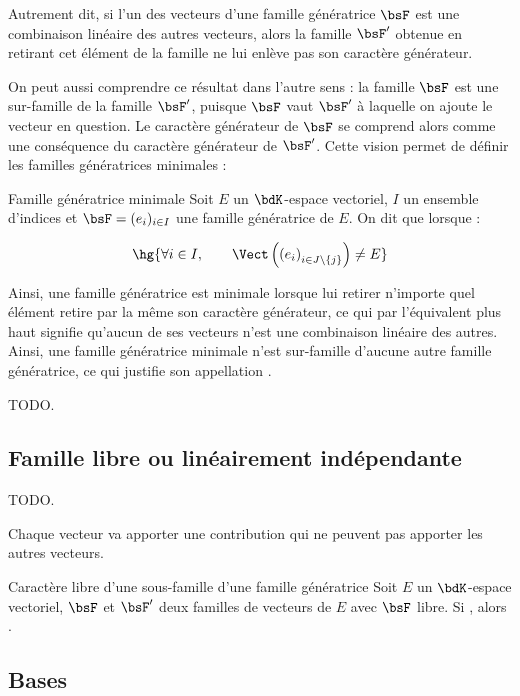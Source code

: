 \documentclass[a4paper,french,bookmarks]{article}
\begin{document}
Autrement dit, si l'un des vecteurs d'une famille génératrice $\bsF$ est une combinaison linéaire des autres vecteurs, alors la famille $\bsF'$ obtenue en retirant cet élément de la famille ne lui enlève pas son caractère générateur.

On peut aussi comprendre ce résultat dans l'autre sens : la famille $\bsF$ est une sur-famille de la famille $\bsF'$, puisque $\bsF$ vaut $\bsF'$ à laquelle on ajoute le vecteur en question. Le caractère générateur de $\bsF$ se comprend alors comme une conséquence du caractère générateur de $\bsF'$. Cette vision permet de définir les familles génératrices minimales :

\begin{definition}{Famille génératrice minimale}{}
    Soit $E$ un $\bdK$-espace vectoriel, $I$ un ensemble d'indices et $\bsF = (e_i)_{i \in I} $ une famille génératrice de $E$. On dit que  lorsque :
    
    \[ \hg{\forall i \in I,\qquad \Vect\left(\left(e_i\right)_{i \in J \backslash \{ j \}}\right) \neq E}\]
\end{definition}

Ainsi, une famille génératrice est minimale lorsque lui retirer n'importe quel élément retire par la même son caractère générateur, ce qui par l'équivalent plus haut signifie qu'aucun de ses vecteurs n'est une combinaison linéaire des autres. Ainsi, une famille génératrice minimale n'est sur-famille d'aucune autre famille génératrice, ce qui justifie son appellation .

TODO.

\subsection{Famille libre ou linéairement indépendante}

TODO.

Chaque vecteur va apporter une contribution qui ne peuvent pas apporter les autres vecteurs.

\begin{property}{Caractère libre d'une sous-famille d'une famille génératrice}{}
    Soit $E$ un $\bdK$-espace vectoriel, $\bsF$ et $\bsF'$ deux familles de vecteurs de $E$ avec $\bsF$ libre. Si , alors .
\end{property}

\subsection{Bases}
\end{document}
